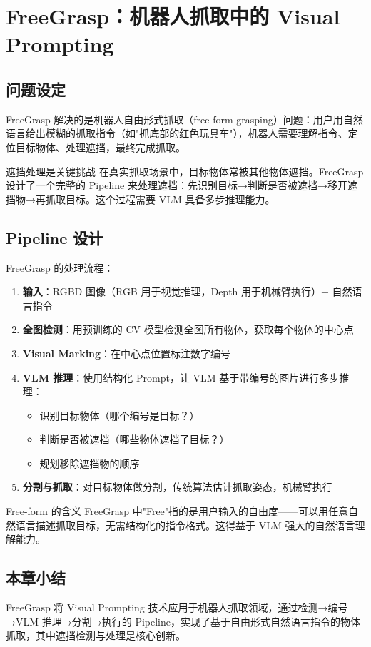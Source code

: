 \section{FreeGrasp：机器人抓取中的 Visual Prompting}

\subsection{问题设定}

FreeGrasp 解决的是机器人自由形式抓取（free-form grasping）问题：用户用自然语言给出模糊的抓取指令（如"抓底部的红色玩具车"），机器人需要理解指令、定位目标物体、处理遮挡，最终完成抓取。

\begin{knowledgebox}{遮挡处理是关键挑战}
在真实抓取场景中，目标物体常被其他物体遮挡。FreeGrasp 设计了一个完整的 Pipeline 来处理遮挡：先识别目标→判断是否被遮挡→移开遮挡物→再抓取目标。这个过程需要 VLM 具备多步推理能力。
\end{knowledgebox}

\subsection{Pipeline 设计}

FreeGrasp 的处理流程：

\begin{enumerate}
    \item \textbf{输入}：RGBD 图像（RGB 用于视觉推理，Depth 用于机械臂执行）+ 自然语言指令
    \item \textbf{全图检测}：用预训练的 CV 模型检测全图所有物体，获取每个物体的中心点
    \item \textbf{Visual Marking}：在中心点位置标注数字编号
    \item \textbf{VLM 推理}：使用结构化 Prompt，让 VLM 基于带编号的图片进行多步推理：
    \begin{itemize}
        \item 识别目标物体（哪个编号是目标？）
        \item 判断是否被遮挡（哪些物体遮挡了目标？）
        \item 规划移除遮挡物的顺序
    \end{itemize}
    \item \textbf{分割与抓取}：对目标物体做分割，传统算法估计抓取姿态，机械臂执行
\end{enumerate}

\begin{importantbox}{Free-form 的含义}
FreeGrasp 中"Free"指的是用户输入的自由度——可以用任意自然语言描述抓取目标，无需结构化的指令格式。这得益于 VLM 强大的自然语言理解能力。
\end{importantbox}

\subsection{本章小结}

FreeGrasp 将 Visual Prompting 技术应用于机器人抓取领域，通过检测→编号→VLM 推理→分割→执行的 Pipeline，实现了基于自由形式自然语言指令的物体抓取，其中遮挡检测与处理是核心创新。


